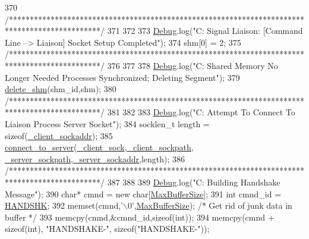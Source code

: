 \begin{DoxyCode}
370     \textcolor{comment}{/**********************************************************************************************/}
371 
372 
373     \mbox{\hyperlink{_cli_8h_ab6d95a4e6a59b4ad033ed3af31d878e0}{Debug}}.log(\textcolor{stringliteral}{"C: Signal Liaison: [Command Line --> Liaison] Socket Setup Completed"});
374     shm[0] = 2;
375     \textcolor{comment}{/**********************************************************************************************/}
376 
377 
378     \mbox{\hyperlink{_cli_8h_ab6d95a4e6a59b4ad033ed3af31d878e0}{Debug}}.log(\textcolor{stringliteral}{"C: Shared Memory No Longer Needed Processes Synchronized; Deleting Segment"});
379     \mbox{\hyperlink{cli__helper_8hpp_a29ecb490f9644dd283298edaaa0b2130}{delete\_shm}}(shm\_id,shm);
380     \textcolor{comment}{/**********************************************************************************************/}
381 
382 
383     \mbox{\hyperlink{_cli_8h_ab6d95a4e6a59b4ad033ed3af31d878e0}{Debug}}.log(\textcolor{stringliteral}{"C: Attempt To Connect To Liaison Process Server Socket"});
384     socklen\_t length = \textcolor{keyword}{sizeof}(\mbox{\hyperlink{class_c_l_i_a8c449fcba5105eec8d582c4695bfaca9}{\_client\_sockaddr}});
385     \mbox{\hyperlink{cli__helper_8hpp_ab6f42e113e3dbd5dc0dceb087e3d6474}{connect\_to\_server}}(\mbox{\hyperlink{class_c_l_i_a89c215687bff66a3e0359a17bac3657d}{\_client\_sock}},\mbox{\hyperlink{class_c_l_i_ad3b7579608f8c2e1d4c01a8668f701d9}{\_client\_sockpath}},
      \mbox{\hyperlink{class_c_l_i_a582f907a9e5dc5c0dcd264e2f1b14f76}{\_server\_sockpath}},\mbox{\hyperlink{class_c_l_i_a8100e64420f5528d1a09a18433ae24f9}{\_server\_sockaddr}},length);
386     \textcolor{comment}{/**********************************************************************************************/}
387 
388 
389     \mbox{\hyperlink{_cli_8h_ab6d95a4e6a59b4ad033ed3af31d878e0}{Debug}}.log(\textcolor{stringliteral}{"C: Building Handshake Message"});
390     \textcolor{keywordtype}{char}* cmnd = \textcolor{keyword}{new} \textcolor{keywordtype}{char}[\mbox{\hyperlink{_cli_8h_a97a33a33e5428e13cfa0eff5ba0e846f}{MaxBufferSize}}];
391     \textcolor{keywordtype}{int} cmnd\_id = \mbox{\hyperlink{_command_codes_8h_a5ca3130c74a24a8e4d792e9d11fd8d95}{HANDSHK}};
392     memset(cmnd,\textcolor{charliteral}{'\(\backslash\)0'},\mbox{\hyperlink{_cli_8h_a97a33a33e5428e13cfa0eff5ba0e846f}{MaxBufferSize}}); \textcolor{comment}{/* Get rid of junk data in buffer */}
393     memcpy(cmnd,&cmnd\_id,\textcolor{keyword}{sizeof}(\textcolor{keywordtype}{int}));
394     memcpy(cmnd + \textcolor{keyword}{sizeof}(\textcolor{keywordtype}{int}), \textcolor{stringliteral}{"HANDSHAKE-"}, \textcolor{keyword}{sizeof}(\textcolor{stringliteral}{"HANDSHAKE-"}));

\end{DoxyCode}

